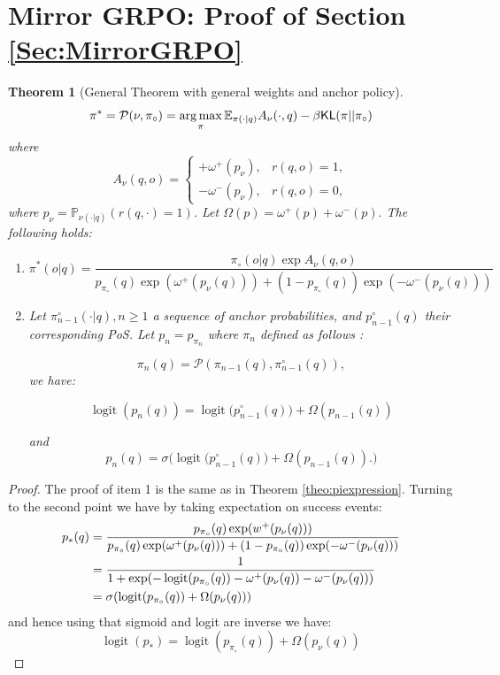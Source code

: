 \documentclass[11pt,reqno]{amsart}
\newtheorem{theorem}{Theorem}
\def\argmax{\operatornamewithlimits{arg\,max}}
\DeclareMathOperator{\logit}{logit}
\begin{document}
\section{Mirror GRPO: Proof of Section \ref{Sec:MirrorGRPO} }\label{sec:generalapp}
\begin{theorem}[General Theorem with general weights and anchor policy]
\label{theo:general}
\[ \pi^*= \mathcal{P}(\nu, \pi_{\circ})=\argmax_{\pi} \mathbb{E}_{\pi(\cdot|q)} A_{\nu}(\cdot,q) - \beta \mathsf{KL} (\pi|| \pi_{\circ})\]
where 
\begin{equation}
\label{eq:grpo-weights}
A_{\nu}(q,o)=
\begin{cases}
+\omega^+(p_\nu), & r(q,o)=1,\\
-\omega^-(p_\nu), & r(q,o)=0,
\end{cases}
\end{equation}
where $p_{\nu}= \mathbb{P}_{\nu(\cdot|q)}(r(q,\cdot) =1) $. Let $\Omega(p)=\omega^+(p) + \omega^-(p). $
The following holds:
\begin{enumerate}
\item \[ \pi^* (o|q)=\frac{ \pi_{\circ} (o|q) \exp A_{\nu}(q,o)}{ p_{\pi_{\circ}}(q) \exp(\omega^+(p_\nu(q))) + (1- p_{\pi_{\circ}}(q)) \exp(- \omega^-(p_\nu(q)))}   \]
\item  Let $\pi^{\circ}_{n-1}(\cdot|q), n \geq 1$ a sequence of anchor probabilities, and $p^\circ_{n-1}(q)$ their corresponding PoS. Let $p_{n}=p_{\pi_{n}}$ where 
$\pi_{n}$  defined as follows : 

 \[ \pi_{n}(q) =  \mathcal{P}( \pi_{n-1}(q),  \pi^{\circ}_{n-1}(q) ), \]
we have: 

\[ \logit (p_{n} (q) ) = \logit \Big( p^{\circ}_{n-1} (q) \Big)+ \Omega (p_{n-1}(q) )  \]

and \[ p_{n}(q) = \sigma \Big( \logit \Big( p^{\circ}_{n-1} (q) \Big)+ \Omega (p_{n-1}(q) ) .\Big)\]

\end{enumerate} 
\end{theorem}

\begin{proof}
The proof of item 1 is the same as in Theorem \ref{theo:piexpression}. Turning to the second point we have by taking expectation on success events:
\begin{align*}
p_*(q) &= \frac{ p_{\pi_{\circ}}(q) \exp(w^+ (p_{\nu}(q)) )}{p_{\pi_{\circ}}(q) \exp(\omega^+(p_\nu(q))) + (1- p_{\pi_{\circ}}(q)) \exp(- \omega^-(p_\nu(q)))}\\
&= \frac{1}{1+ \exp (- \logit (p_{\pi_{\circ}}(q) ) - \omega^+(p_{\nu}(q)) - \omega^-(p_{\nu}(q)) )}\\
& = \sigmoid (\logit (p_{\pi_{\circ}}(q) ) + \Omega(p_{\nu}(q)))
\end{align*}
and hence using that sigmoid and logit are inverse we have:
\[ \logit(p_*) = \logit (p_{\pi_{\circ}}(q) ) + \Omega(p_{\nu}(q))\]


\end{proof}
\end{document}
